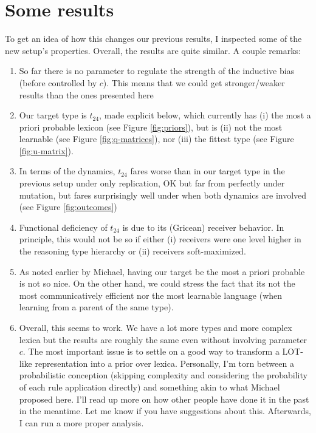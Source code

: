 \documentclass[a4paper]{article}
\begin{document}
\section*{Some results} To get an idea of how this changes our previous results, I inspected some of the new setup's properties. Overall, the results are quite similar. A couple remarks: 
\begin{enumerate}
\item So far there is no parameter to regulate the strength of the inductive bias (before controlled by $c$). This means that we could get stronger/weaker results than the ones presented here
\item Our target type is $t_{24}$, made explicit below, which currently has (i) the most a priori probable lexicon (see Figure \ref{fig:priors}), but is (ii) not the most learnable (see Figure \ref{fig:q-matrices}), nor (iii) the fittest type (see Figure \ref{fig:u-matrix}). 
\item In terms of the dynamics, $t_{24}$ fares worse than in our target type in the previous setup under only replication, OK but far from perfectly under mutation, but fares surprisingly well under when both dynamics are involved (see Figure \ref{fig:outcomes})
\item Functional deficiency of $t_{24}$ is due to its (Gricean) receiver behavior. In principle, this would not be so if either (i) receivers were one level higher in the reasoning type hierarchy or (ii) receivers soft-maximized.
\item As noted earlier by Michael, having our target be the most a priori probable is not so nice. On the other hand, we could stress the fact that its not the most communicatively efficient nor the most learnable language (when learning from a parent of the same type). 
\item Overall, this seems to work. We have a lot more types and more complex lexica but the results are roughly the same even without involving parameter $c$. The most important issue is to settle on a good way to transform a LOT-like representation into a prior over lexica. Personally, I'm torn between a probabilistic conception (skipping complexity and considering the probability of each rule application directly) and something akin to what Michael proposed here. I'll read up more on how other people have done it in the past in the meantime. Let me know if you have suggestions about this. Afterwards, I can run a more proper analysis.
\end{enumerate}
\end{document}

